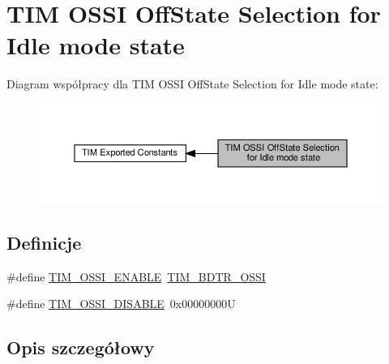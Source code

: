 \hypertarget{group___t_i_m___o_s_s_i___off___state___selection__for___idle__mode__state}{}\section{T\+IM O\+S\+SI Off\+State Selection for Idle mode state}
\label{group___t_i_m___o_s_s_i___off___state___selection__for___idle__mode__state}
Diagram współpracy dla T\+IM O\+S\+SI Off\+State Selection for Idle mode state\+:\nopagebreak
\begin{figure}[H]
\begin{center}
\leavevmode
\includegraphics[width=350pt]{group___t_i_m___o_s_s_i___off___state___selection__for___idle__mode__state}
\end{center}
\end{figure}
\subsection*{Definicje}
\begin{DoxyCompactItemize}
\item 
\#define \hyperlink{group___t_i_m___o_s_s_i___off___state___selection__for___idle__mode__state_gae5b5901b177cd054cd5503630892680f}{T\+I\+M\+\_\+\+O\+S\+S\+I\+\_\+\+E\+N\+A\+B\+LE}~\hyperlink{group___peripheral___registers___bits___definition_gab1cf04e70ccf3d4aba5afcf2496a411a}{T\+I\+M\+\_\+\+B\+D\+T\+R\+\_\+\+O\+S\+SI}
\item 
\#define \hyperlink{group___t_i_m___o_s_s_i___off___state___selection__for___idle__mode__state_gab1a20c65a3d24ef770f8a2a14c24130b}{T\+I\+M\+\_\+\+O\+S\+S\+I\+\_\+\+D\+I\+S\+A\+B\+LE}~0x00000000U
\end{DoxyCompactItemize}


\subsection{Opis szczegółowy}


